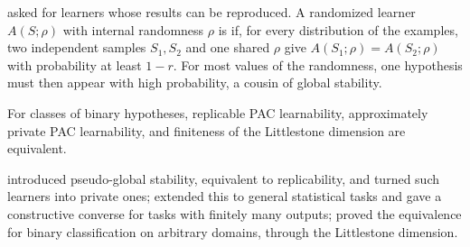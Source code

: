 \begin{refsection}
\Textcite{ImpagliazzoLeiPitassiSorrell2022} asked for learners whose results can be reproduced. A randomized learner $A(S;\rho)$ with internal randomness $\rho$ is  if, for every distribution of the examples, two independent samples $S_1,S_2$ and one shared $\rho$ give $A(S_1;\rho)=A(S_2;\rho)$ with probability at least $1-r$. For most values of the randomness, one hypothesis must then appear with high probability, a cousin of global stability.

\begin{theorem}\label{thm:littlestone:replicable}
For classes of binary hypotheses, replicable PAC learnability, approximately private PAC learnability, and finiteness of the Littlestone dimension are equivalent.
\end{theorem}

\Textcite{GhaziKumarManurangsi2021} introduced pseudo-global stability, equivalent to replicability, and turned such learners into private ones; \textcite{BunEtAl2023} extended this to general statistical tasks and gave a constructive converse for tasks with finitely many outputs; \textcite{KalavasisKarbasiMoranVelegkas2023} proved the equivalence for binary classification on arbitrary domains, through the Littlestone dimension.


\end{refsection}
